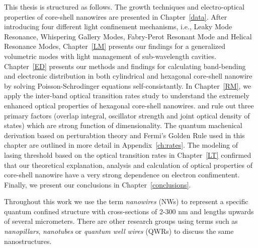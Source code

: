This thesis is structured as follows. The growth techniques and electro-optical
properties of core-shell nanowires are presented in Chapter~\ref{data}.  After
introducing four different light confinement mechanisms, i.e., Leaky Mode
Resonance, Whispering Gallery Modes, Fabry-Perot Resonant Mode and Helical
Resonance Modes, Chapter~\ref{LM} presents our findings for a generalized
volumetric modes with light management of sub-wavelength cavities.
Chapter~\ref{ED} presents our methods and findings for calculating band-bending
and electronic distribution in both cylindrical and hexagonal core-shell
nanowire by solving Poisson-Schrodinger equations self-consistantly.  In
Chapter~\ref{RM}, we apply the inter-band optical transition rates study to
understand the extremely enhanced optical properties of hexagonal core-shell
nanowires. and rule out three primary factors (overlap integral, oscillator
strength and joint optical density of states) which are strong function of
dimensionality.  The quantum machenical derivation based on perturabtion theory
and Fermi's Golden Rule used in this chapter are outlined in more detail in
Appendix~\ref{ch:rates}. The modeling of lasing threshold based on the optical
transition rates in Chapter~\ref{LT} confirmed that our theoretical
explanation, analysis and calculation of optical properties of core-shell
nanowire have a very strong dependence on electron confimentent. Finally, we
present our conclusions in Chapter~\ref{conclusions}. 

Throughout this work we use the term  {\em nanowires} (NWs) to represent a
specific quantum confined structure with cross-sections of 2-300 nm and lengths
upwards of several micrometers. There are other research groups using terms
such as {\em nanopillars}, {\em nanotubes} or {\em quantum well wires} (QWRs)
to discuss the same nanostructures.
